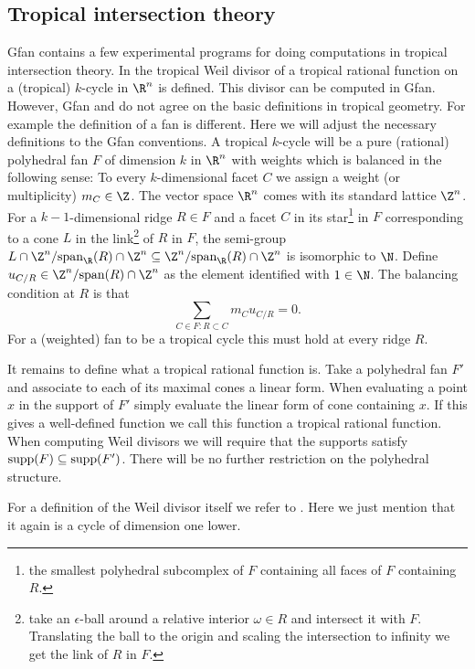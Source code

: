 \subsection{Tropical intersection theory}
Gfan contains a few experimental programs for doing computations in
tropical intersection theory. In \cite[Definition 3.4]{allermannRau}
the tropical Weil divisor of a tropical rational function on a
(tropical) $k$-cycle in $\R^n$ is defined. This divisor can be
computed in Gfan. However, Gfan and \cite{allermannRau} do not agree
on the basic definitions in tropical geometry. For example the
definition of a fan is different. Here we will adjust the necessary
definitions to the Gfan conventions. A tropical $k$-cycle will be a
pure (rational) polyhedral fan $F$ of dimension $k$ in $\R^n$ with
weights which is balanced in the following sense: To every
$k$-dimensional facet $C$ we assign a weight (or multiplicity)
$m_C\in\Z$. The vector space $\R^n$ comes with its standard lattice
$\Z^n$. For a $k-1$-dimensional ridge $R\in F$ and a facet $C$ in its
star\footnote{the smallest polyhedral subcomplex of $F$ containing all
faces of $F$ containing $R$.} in $F$ corresponding to a cone $L$ in
the link\footnote{take an $\epsilon$-ball around a relative interior
$\omega\in R$ and intersect it with $F$. Translating the ball to the
origin and scaling the intersection to infinity we get the link of $R$
in $F$.} of $R$ in $F$, the semi-group
$L\cap\Z^n/\textup{span}_{\R}(R)\cap\Z^n\subseteq
\Z^n/\textup{span}_{\R}(R)\cap\Z^n$ is isomorphic to $\N$. Define
$u_{C/R}\in \Z^n/\textup{span}(R)\cap\Z^n$ as the element identified
with $1\in\N$. The balancing condition at $R$ is that
$$\sum_{C\in F:R\subset C} m_Cu_{C/R}=0.$$
For a (weighted) fan to be a tropical cycle this must hold at every ridge $R$.

It remains to define what a tropical rational function is. Take a
polyhedral fan $F'$ and associate to each of its maximal cones a
linear form. When evaluating a point $x$ in the support of $F'$ simply
evaluate the linear form of cone containing $x$. If this gives a
well-defined function we call this function a tropical rational
function.  When computing Weil divisors we will require that the supports satisfy
$\textup{supp}(F)\subseteq \textup{supp}(F')$.  There will be no further restriction
on the polyhedral structure.

For a definition of the Weil divisor itself we refer
to \cite[Definition 3.4]{allermannRau}. Here we just mention that it
again is a cycle of dimension one lower.

